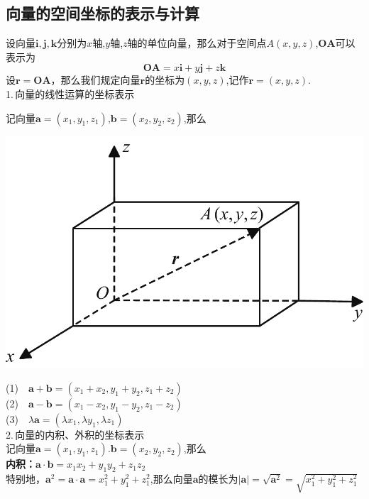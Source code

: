 \subsection{向量的空间坐标的表示与计算}
\noindent
\begin{minipage}{0.6\linewidth}
\hspace*{2em}设向量$\boldsymbol{i},\boldsymbol{j},\boldsymbol{k}$分别为$x$轴,$y$轴,$z$轴的单位向量，那么对于空间点$A(x,y,z)$,$\boldsymbol{OA}$可以表示为
\begin{equation}
	\boldsymbol{OA}=x\boldsymbol{i}+y\boldsymbol{j}+z\boldsymbol{k}
\end{equation}
设$\boldsymbol{r}=\boldsymbol{OA}$，那么我们规定向量$\boldsymbol{r}$的坐标为$(x,y,z)$,记作$\boldsymbol{r}=(x,y,z)$.\\
1.$\,$向量的线性运算的坐标表示
\par 记向量$\boldsymbol{a}=(x_1,y_1,z_1)$,$\boldsymbol{b}=(x_2,y_2,z_2)$,那么
\end{minipage}
\begin{minipage}{0.4\linewidth}
	\centering
	\includegraphics[width = 0.9\linewidth]{pic/C-5/veclinar}
	\vspace*{-1em}
	\label{向量的空间坐标表示}
\end{minipage}
\noindent(1)$\quad \boldsymbol{a}+\boldsymbol{b}=(x_1+x_2,y_1+y_2,z_1+z_2)$\\
(2)$\quad \boldsymbol{a}-\boldsymbol{b}=(x_1-x_2,y_1-y_2,z_1-z_2)$\\
(3)$\quad \lambda \boldsymbol{a}=(\lambda x_1,\lambda y_1,\lambda z_1)$\\
2.$\,$向量的内积、外积的坐标表示\\
记向量$\boldsymbol{a}=(x_1,y_1,z_1).\boldsymbol{b}=(x_2,y_2,z_2)$,那么\\
\textbf{内积：}$\boldsymbol{a}\cdot\boldsymbol{b}=x_1x_2+y_1y_2+z_1z_2$\\
特别地，$\boldsymbol{a}^2=\boldsymbol{a}\cdot\boldsymbol{a}=x_1^2+y_1^2+z_1^2$,那么向量$\boldsymbol{a}$的模长为$|\boldsymbol{a}|=\sqrt{\boldsymbol{a}^2}=\sqrt{x_1^2+y_1^2+z_1^2}$\\

